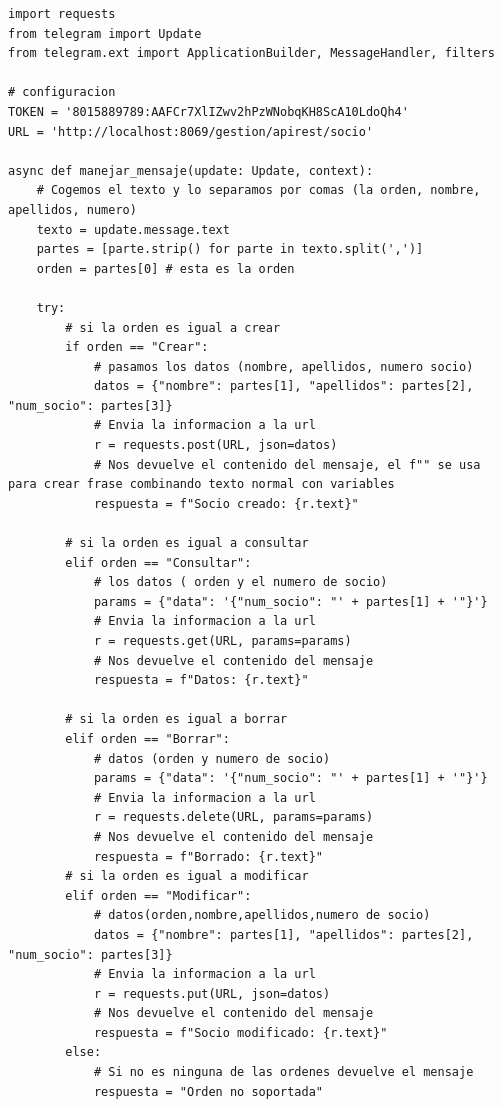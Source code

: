 \documentclass[a4paper,12pt]{article}
\begin{document}
\vspace{0.5cm}
\begin{lstlisting}[style=javascript]
    import requests
from telegram import Update
from telegram.ext import ApplicationBuilder, MessageHandler, filters

# configuracion
TOKEN = '8015889789:AAFCr7XlIZwv2hPzWNobqKH8ScA10LdoQh4'
URL = 'http://localhost:8069/gestion/apirest/socio'

async def manejar_mensaje(update: Update, context):
    # Cogemos el texto y lo separamos por comas (la orden, nombre, apellidos, numero)
    texto = update.message.text
    partes = [parte.strip() for parte in texto.split(',')]
    orden = partes[0] # esta es la orden

    try:
        # si la orden es igual a crear
        if orden == "Crear":
            # pasamos los datos (nombre, apellidos, numero socio)
            datos = {"nombre": partes[1], "apellidos": partes[2], "num_socio": partes[3]}
            # Envia la informacion a la url
            r = requests.post(URL, json=datos)
            # Nos devuelve el contenido del mensaje, el f"" se usa para crear frase combinando texto normal con variables
            respuesta = f"Socio creado: {r.text}"

        # si la orden es igual a consultar
        elif orden == "Consultar":
            # los datos ( orden y el numero de socio)
            params = {"data": '{"num_socio": "' + partes[1] + '"}'}
            # Envia la informacion a la url
            r = requests.get(URL, params=params)
            # Nos devuelve el contenido del mensaje
            respuesta = f"Datos: {r.text}"

        # si la orden es igual a borrar
        elif orden == "Borrar":
            # datos (orden y numero de socio)
            params = {"data": '{"num_socio": "' + partes[1] + '"}'}
            # Envia la informacion a la url
            r = requests.delete(URL, params=params)
            # Nos devuelve el contenido del mensaje
            respuesta = f"Borrado: {r.text}"
        # si la orden es igual a modificar
        elif orden == "Modificar":
            # datos(orden,nombre,apellidos,numero de socio)
            datos = {"nombre": partes[1], "apellidos": partes[2], "num_socio": partes[3]}
            # Envia la informacion a la url
            r = requests.put(URL, json=datos)
            # Nos devuelve el contenido del mensaje
            respuesta = f"Socio modificado: {r.text}"
        else:
            # Si no es ninguna de las ordenes devuelve el mensaje
            respuesta = "Orden no soportada"


\end{lstlisting}
\end{document}
